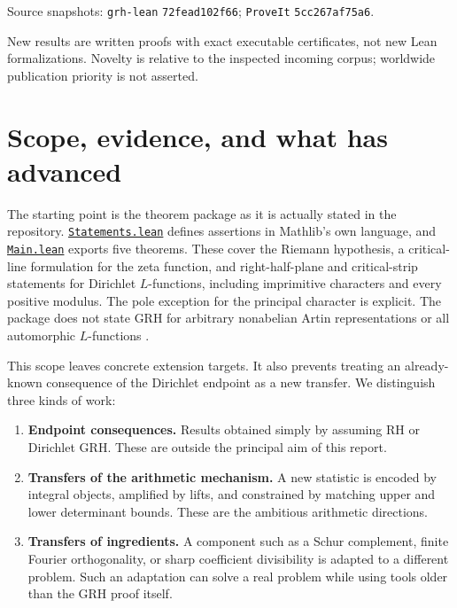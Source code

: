 \documentclass[11pt,letterpaper]{article}
\theoremstyle{definition}\newtheorem{definition}[theorem]{Definition}
\newcommand{\src}[2]{\href{https://github.com/lsernau/grh-lean/blob/72fead102f663d5c7a407964a13dc0cf9d977207/grh/src/#1}{#2}}
\begin{document}
\begin{titlepage}
\vfill
{\small\color{muted}
Source snapshots: \texttt{grh-lean} \texttt{72fead102f66};
\texttt{ProveIt} \texttt{5cc267af75a6}.\par
New results are written proofs with exact executable certificates, not new Lean
formalizations. Novelty is relative to the inspected incoming corpus;
worldwide publication priority is not asserted.}
\end{titlepage}
\hypersetup{pageanchor=true}
\tableofcontents
\clearpage
{}

\section{Scope, evidence, and what has advanced}
\label{sec:scope}

The starting point is the theorem package as it is actually stated in the
repository. \src{Statements.lean}{\texttt{Statements.lean}} defines assertions
in Mathlib's own language, and \src{Main.lean}{\texttt{Main.lean}} exports five
theorems. These cover the Riemann hypothesis, a critical-line formulation for
the zeta function, and right-half-plane and critical-strip statements for
Dirichlet \(L\)-functions, including imprimitive characters and every positive
modulus. The pole exception for the principal character is explicit.
The package does not state GRH for arbitrary nonabelian Artin representations
or all automorphic \(L\)-functions \cite{Repo}.

This scope leaves concrete extension targets. It also prevents treating an
already-known consequence of the Dirichlet endpoint as a new transfer.
We distinguish three kinds of work:

\begin{enumerate}
\item \textbf{Endpoint consequences.} Results obtained simply by assuming RH
or Dirichlet GRH. These are outside the principal aim of this report.
\item \textbf{Transfers of the arithmetic mechanism.} A new statistic is encoded
by integral objects, amplified by lifts, and constrained by matching upper and
lower determinant bounds. These are the ambitious arithmetic directions.
\item \textbf{Transfers of ingredients.} A component such as a Schur complement,
finite Fourier orthogonality, or sharp coefficient divisibility is adapted to
a different problem. Such an adaptation can solve a real problem while using
tools older than the GRH proof itself.
\end{enumerate}
\end{document}
